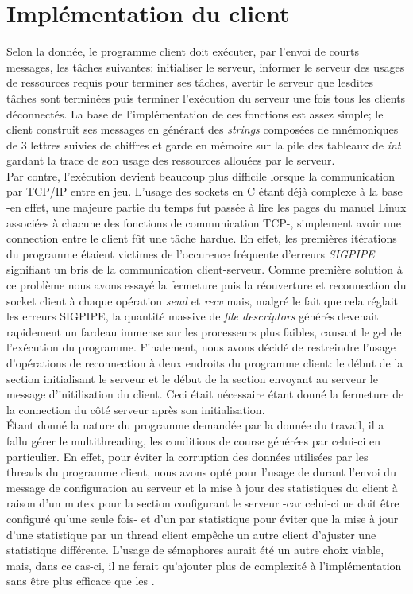 \documentclass[11pt]{article}
\begin{document}
\section*{ Implémentation du client }
\setlength{\parindent}{20pt}
Selon la donnée, le programme client doit exécuter, par l'envoi de courts messages, les tâches suivantes: initialiser le serveur, informer le 
serveur des usages de ressources requis pour terminer ses tâches, avertir le serveur que lesdites tâches sont terminées puis terminer l'exécution 
du serveur une fois tous les clients déconnectés. La base de l'implémentation de ces fonctions est assez simple; le client construit ses messages 
en générant des \emph{strings} composées de mnémoniques de 3 lettres suivies de chiffres et garde en mémoire sur la pile des tableaux de 
\emph{int} gardant la trace de son usage des ressources allouées par le serveur. 
\\
Par contre, l'exécution devient beaucoup plus difficile lorsque la communication par TCP/IP entre en jeu. L'usage des sockets en C étant déjà 
complexe à la base -en effet, une majeure partie du temps fut passée à lire les pages du manuel Linux associées à chacune des fonctions de 
communication TCP-, simplement avoir une connection entre le client fût une tâche hardue. En effet, les premières itérations du programme étaient 
victimes de l'occurence fréquente d'erreurs \emph{SIGPIPE} signifiant un bris de la communication client-serveur. Comme première solution à ce 
problème nous avons essayé la fermeture puis la réouverture et reconnection du socket client à chaque opération \emph{send} et \emph{recv} mais, 
malgré le fait que cela réglait les erreurs SIGPIPE, la quantité massive de \emph{file descriptors} générés devenait rapidement un fardeau 
immense sur les processeurs plus faibles, causant le gel de l'exécution du programme. Finalement, nous avons décidé de restreindre l'usage 
d'opérations de reconnection à deux endroits du programme client: le début de la section initialisant le serveur et le début de la section 
envoyant au serveur le message d'initilisation du client. Ceci était nécessaire étant donné la fermeture de la connection du côté serveur après 
son initialisation.
\\
Étant donné la nature du programme demandée par la donnée du travail, il a fallu gérer le multithreading, les conditions de course générées par 
celui-ci en particulier. En effet, pour éviter la corruption des données utilisées par les threads du programme client, nous avons opté pour 
l'usage de  durant l'envoi du message de configuration au serveur et la mise à jour des statistiques du client à raison d'un mutex 
pour la section configurant le serveur -car celui-ci ne doit être configuré qu'une seule fois- et d'un  par statistique pour éviter 
que la mise à jour d'une statistique par un thread client empêche un autre client d'ajuster une statistique différente. L'usage de sémaphores 
aurait été un autre choix viable, mais, dans ce cas-ci, il ne ferait qu'ajouter plus de complexité à l'implémentation sans être plus efficace que 
les .
\\
\end{document}
